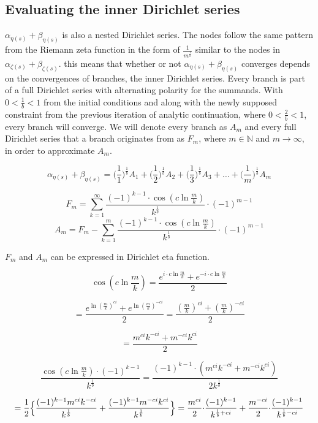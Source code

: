 \documentclass{amsart}
\begin{document}
	\subsection{Evaluating the inner Dirichlet series}
	$\alpha_{\eta(s)} + \beta_{\eta(s)}$ is also a nested Dirichlet series. The nodes follow the same pattern from the Riemann zeta function in the form of $\frac{1}{m^{\frac{1}{b}}}$ similar to the nodes in $\alpha_{\zeta(s)} + \beta_{\zeta(s)}$. this means that whether or not $\alpha_{\eta(s)} + \beta_{\eta(s)}$ converges depends on the convergences of branches, the inner Dirichlet series. Every branch is part of a full Dirichlet series with alternating polarity for the summands. With $0 < \frac{1}{b} < 1$ from the initial conditions and along with the newly supposed constraint from the previous iteration of analytic continuation, where $0 < \frac{2}{b} < 1$, every branch will converge. We will denote every branch as $A_m$ and every full Dirichlet series that a branch originates from as $F_m$, where $m \in \mathbb{N}$ and $m \to \infty$, in order to approximate $A_m$.
	
	\[ \alpha_{\eta(s)} + \beta_{\eta(s)} = \Big(\frac{1}{1}\Big)^{\frac{1}{b}}A_1 + \Big(\frac{1}{2}\Big)^{\frac{1}{b}}A_2 + \Big(\frac{1}{3}\Big)^{\frac{1}{b}}A_3 + \dots + \Big(\frac{1}{m}\Big)^{\frac{1}{b}}A_m \]
	
	\[ F_m = \sum\limits_{k=1}^{\infty} \frac{(-1)^{k-1} {\cdot} \cos(c \ln \frac{m}{k})}{k^{\frac{1}{b}}} {\cdot} (-1)^{m-1} \]
	\[ A_m = F_m - \sum\limits_{k=1}^{m} \frac{(-1)^{k-1} {\cdot} \cos(c \ln \frac{m}{k})}{k^{\frac{1}{b}}} {\cdot} (-1)^{m-1} \]
	\[\]
	
	$F_m$ and $A_m$ can be expressed in Dirichlet eta function.
	
	\[ \cos(c \ln \frac{m}{k}) = \frac{e^{i \cdot c \ln \frac{m}{k}} + e^{-i \cdot c \ln \frac{m}{k}}}{2} \]
	
	\[ = \frac{e^{\ln (\frac{m}{k})^{ci}} + e^{\ln (\frac{m}{k})^{-ci}}}{2} = \frac{(\frac{m}{k})^{ci} + (\frac{m}{k})^{-ci}}{2} \]
	
	\[ = \frac{m^{ci}k^{-ci} + m^{-ci}k^{ci}}{2} \]
	
	\[ \frac{\cos(c \ln \frac{m}{k}) \cdot (-1)^{k-1}}{k^{\frac{1}{b}}} = \frac{ (-1)^{k-1} {\cdot} (m^{ci}k^{-ci} + m^{-ci}k^{ci}) }{2k^{\frac{1}{b}}}  \]
	
	\[ = \frac{1}{2} \Bigl\{ \frac{ (-1)^{k-1}m^{ci}k^{-ci}  }{k^{\frac{1}{b}}} + \frac{ (-1)^{k-1}m^{-ci}k^{ci}  }{k^{\frac{1}{b}}}  \Bigr\} = \frac{m^{ci}}{2} {\cdot} \frac{(-1)^{k-1}}{k^{\frac{1}{b}+ci}} + \frac{m^{-ci}}{2} {\cdot} \frac{(-1)^{k-1}}{k^{\frac{1}{b}-ci}} \]
	
\end{document}

